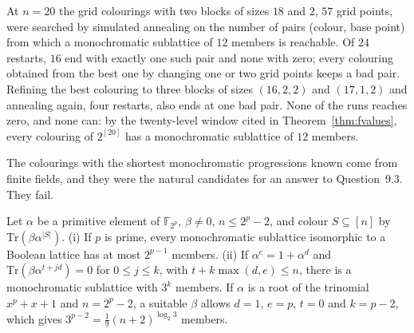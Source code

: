 At $n=20$ the grid colourings with two blocks of sizes $18$ and $2$, $57$ grid points, were searched by simulated annealing on the number of pairs (colour, base point) from which a monochromatic sublattice of $12$ members is reachable. Of $24$ restarts, $16$ end with exactly one such pair and none with zero; every colouring obtained from the best one by changing one or two grid points keeps a bad pair. Refining the best colouring to three blocks of sizes $(16,2,2)$ and $(17,1,2)$ and annealing again, four restarts, also ends at one bad pair. None of the runs reaches zero, and none can: by the twenty-level window cited in Theorem~\ref{thm:fvalues}, every colouring of $2^{[20]}$ has a monochromatic sublattice of $12$ members.

The colourings with the shortest monochromatic progressions known come from finite fields, and they were the natural candidates for an answer to Question~9.3. They fail.

\begin{proposition}\label{prop:mseq}
Let $\alpha$ be a primitive element of $\mathbb{F}_{2^{p}}$, $\beta\neq0$, $n\le2^{p}-2$, and colour $S\subseteq[n]$ by $\mathrm{Tr}(\beta\alpha^{|S|})$. \textup{(i)} If $p$ is prime, every monochromatic sublattice isomorphic to a Boolean lattice has at most $2^{p-1}$ members. \textup{(ii)} If $\alpha^{e}=1+\alpha^{d}$ and $\mathrm{Tr}(\beta\alpha^{t+jd})=0$ for $0\le j\le k$, with $t+k\max(d,e)\le n$, there is a monochromatic sublattice with $3^{k}$ members. If $\alpha$ is a root of the trinomial $x^{p}+x+1$ and $n=2^{p}-2$, a suitable $\beta$ allows $d=1$, $e=p$, $t=0$ and $k=p-2$, which gives $3^{p-2}=\frac19(n+2)^{\log_{2}3}$ members.
\end{proposition}

